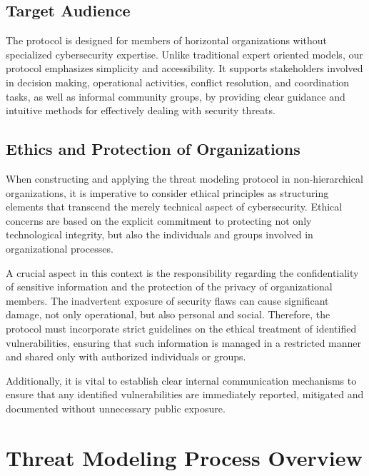 \subsection{Target Audience}
\label{subsec:target_audience}

The protocol is designed for members of horizontal organizations without
specialized cybersecurity expertise. Unlike traditional expert oriented models,
our protocol emphasizes simplicity and accessibility. It supports stakeholders
involved in decision making, operational activities, conflict resolution, and
coordination tasks, as well as informal community groups, by providing clear
guidance and intuitive methods for effectively dealing with security threats.

\subsection{Ethics and Protection of Organizations}
\label{subsec:ethics_protection}

When constructing and applying the threat modeling protocol in non-hierarchical
organizations, it is imperative to consider ethical principles as structuring
elements that transcend the merely technical aspect of cybersecurity. Ethical
concerns are based on the explicit commitment to protecting not only
technological integrity, but also the individuals and groups involved in
organizational processes.

A crucial aspect in this context is the responsibility regarding the
confidentiality of sensitive information and the protection of the privacy of
organizational members. The inadvertent exposure of security flaws can cause
significant damage, not only operational, but also personal and social.
Therefore, the protocol must incorporate strict guidelines on the ethical
treatment of identified vulnerabilities, ensuring that such information is
managed in a restricted manner and shared only with authorized individuals or
groups.

Additionally, it is vital to establish clear internal communication mechanisms
to ensure that any identified vulnerabilities are immediately reported,
mitigated and documented without unnecessary public exposure.

\section{Threat Modeling Process Overview}
\label{sec:threat_modeling_process_overview}

